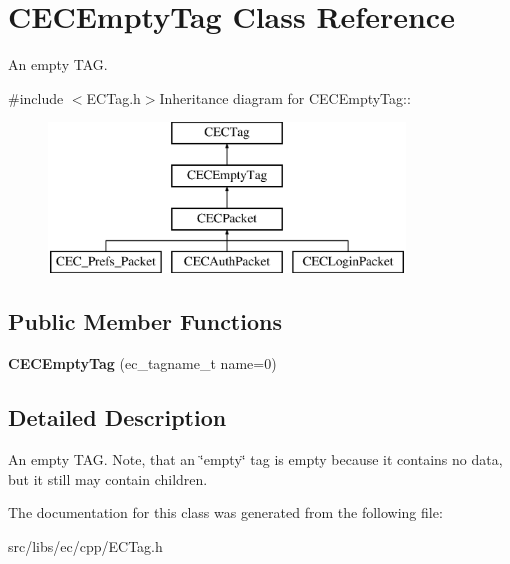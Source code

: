 \section{CECEmptyTag Class Reference}
\label{classCECEmptyTag}


An empty TAG.  


{\ttfamily \#include $<$ECTag.h$>$}Inheritance diagram for CECEmptyTag::\begin{figure}[H]
\begin{center}
\leavevmode
\includegraphics[height=4cm]{classCECEmptyTag}
\end{center}
\end{figure}
\subsection*{Public Member Functions}
\begin{DoxyCompactItemize}
\item 
{\bfseries CECEmptyTag} (ec\_\-tagname\_\-t name=0)\label{classCECEmptyTag_a0295c1493b32321fd5cb86642e673501}

\end{DoxyCompactItemize}


\subsection{Detailed Description}
An empty TAG. Note, that an \char`\"{}empty\char`\"{} tag is empty because it contains no data, but it still may contain children. 

The documentation for this class was generated from the following file:\begin{DoxyCompactItemize}
\item 
src/libs/ec/cpp/ECTag.h\end{DoxyCompactItemize}
